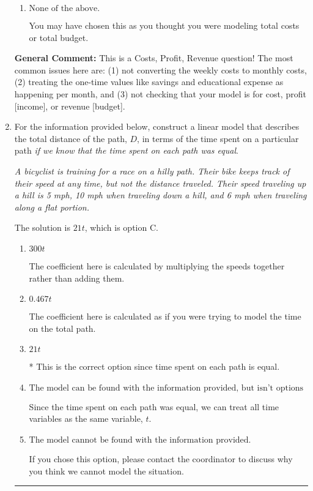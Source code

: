 \documentclass{extbook}[14pt]
\newcommand{\litem}[1]{\item #1

\rule{\textwidth}{0.4pt}}
\begin{document}
\begin{enumerate}
{\begin{enumerate}[label=\Alph*.]
This treats the educational expense and savings as something you get every month rather than a 1-time payment.
\item \( \text{None of the above.} \)

You may have chosen this as you thought you were modeling total costs or total budget.
\end{enumerate}

\textbf{General Comment:} This is a Costs, Profit, Revenue question! The most common issues here are: (1) not converting the weekly costs to monthly costs, (2) treating the one-time values like savings and educational expense as happening per month, and (3) not checking that your model is for cost, profit [income], or revenue [budget].
}
\litem{
For the information provided below, construct a linear model that describes the total distance of the path, $D$, in terms of the time spent on a particular path \textit{if we know that the time spent on each path was equal}.

\begin{center}
    \textit{ A bicyclist is training for a race on a hilly path. Their bike keeps track of their speed at any time, but not the distance traveled. Their speed traveling up a hill is 5 mph, 10 mph when traveling down a hill, and 6 mph when traveling along a flat portion. }
\end{center}
The solution is \( 21 t \), which is option C.\begin{enumerate}[label=\Alph*.]
\item \( 300 t \)

The coefficient here is calculated by multiplying the speeds together rather than adding them.
\item \( 0.467 t \)

The coefficient here is calculated as if you were trying to model the time on the total path.
\item \( 21 t \)

* This is the correct option since time spent on each path is equal.
\item \( \text{The model can be found with the information provided, but isn't options 1-3.} \)

Since the time spent on each path was equal, we can treat all time variables as the same variable, $t$.
\item \( \text{The model cannot be found with the information provided.} \)

If you chose this option, please contact the coordinator to discuss why you think we cannot model the situation.
\end{enumerate}

}
\end{enumerate}
\end{document}
